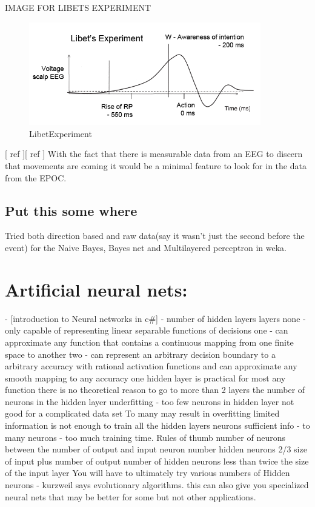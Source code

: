 IMAGE FOR LIBETS EXPERIMENT
\begin{figure}[h!]
\centering
\includegraphics[width=0.9\textwidth,natwidth=632,natheight=281]{./Figures/LibetExperiment.png}
\caption{LibetExperiment}
\end{figure}

[ ref ][ ref ]
With the fact that there is measurable data from an EEG to discern that movements are coming it would be a minimal feature to look for in the data from the EPOC.

\subsection{Put this some where}
Tried both direction based and raw data(say it wasn't just the second before the event) for the Naive Bayes, Bayes net and Multilayered perceptron in weka.

\section{Artificial neural nets:}
- [introduction to Neural networks in c\#] -
number of hidden layers
layers
none - only capable of representing linear separable functions of decisions
one - can approximate any function that contains a continuous mapping from one finite space to another
two - can represent an arbitrary decision boundary to a arbitrary accuracy with rational activation functions and can approximate any smooth mapping to any accuracy
one hidden layer is practical for most any function
there is no theoretical reason to go to more than 2 layers 
the number of neurons in the hidden layer
underfitting - too few neurons in hidden layer
not good for a complicated data set
To many may result in overfitting
limited information is not enough to train all the hidden layers neurons
sufficient info - to many neurons - too much training time.
Rules of thumb
number of neurons between the number of output and input neuron number
hidden neurons 2/3 size of input plus number of output
number of hidden neurons less than twice the size of the input layer
You will have to ultimately try various numbers of Hidden neurons - kurzweil says evolutionary algorithms.
this can also give you specialized neural nets that may be better for some but not other applications.

